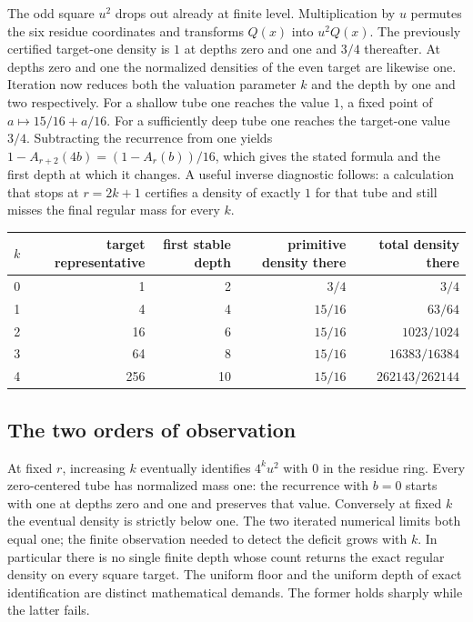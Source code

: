 \documentclass[12pt,letterpaper]{article}
\begin{document}
The odd square $u^2$ drops out already at finite level. Multiplication by $u$ permutes the six residue coordinates and transforms $Q(x)$ into $u^2Q(x)$. The previously certified target-one density is $1$ at depths zero and one and $3/4$ thereafter. At depths zero and one the normalized densities of the even target are likewise one. Iteration now reduces both the valuation parameter $k$ and the depth by one and two respectively. For a shallow tube one reaches the value $1$, a fixed point of $a\mapsto15/16+a/16$. For a sufficiently deep tube one reaches the target-one value $3/4$. Subtracting the recurrence from one yields $1-A_{r+2}(4b)=(1-A_r(b))/16$, which gives the stated formula and the first depth at which it changes. A useful inverse diagnostic follows: a calculation that stops at $r=2k+1$ certifies a density of exactly $1$ for that tube and still misses the final regular mass for every $k$.

\begin{center}
\begin{tabular}{rrrrr}
\hline
$k$&target representative&first stable depth&primitive density there&total density there\\
\hline
0&1&2&$3/4$&$3/4$\\
1&4&4&$15/16$&$63/64$\\
2&16&6&$15/16$&$1023/1024$\\
3&64&8&$15/16$&$16383/16384$\\
4&256&10&$15/16$&$262143/262144$\\
\hline
\end{tabular}
\end{center}

\subsection{The two orders of observation}
At fixed $r$, increasing $k$ eventually identifies $4^ku^2$ with $0$ in the residue ring. Every zero-centered tube has normalized mass one: the recurrence with $b=0$ starts with one at depths zero and one and preserves that value. Conversely at fixed $k$ the eventual density is strictly below one. The two iterated numerical limits both equal one; the finite observation needed to detect the deficit grows with $k$. In particular there is no single finite depth whose count returns the exact regular density on every square target. The uniform floor and the uniform depth of exact identification are distinct mathematical demands. The former holds sharply while the latter fails.
\end{document}
